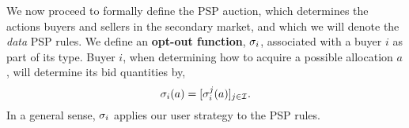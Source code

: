 We now proceed to formally define the PSP auction, which determines the actions 
buyers and sellers in the secondary market, and which we will denote the \emph{data}
PSP rules. 
We define an \textbf{opt-out function}, $\sigma_i$, associated with a buyer $i$ as
part of its type. Buyer $i$, when determining how to acquire a possible allocation $a$,
will determine its bid quantities by,
\begin{equation}\label{opt-out}
    \sigma_i(a) = [\sigma_i^j(a)]_{j\in\mathcal{I}}.
\end{equation}
In a general sense, $\sigma_i$ applies our user strategy to the PSP rules.

